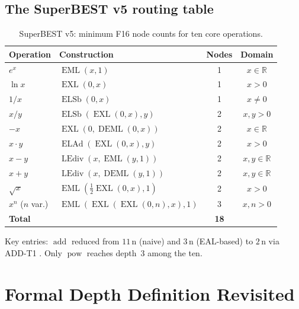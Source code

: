 \documentclass[12pt,a4paper]{article}
\theoremstyle{definition}
\theoremstyle{remark}
\newcommand{\EML}{\operatorname{EML}}
\newcommand{\EXL}{\operatorname{EXL}}
\newcommand{\DEML}{\operatorname{DEML}}
\newcommand{\ELAd}{\operatorname{ELAd}}
\newcommand{\ELSb}{\operatorname{ELSb}}
\newcommand{\LEdiv}{\operatorname{LEdiv}}
\newcommand{\addop}{\operatorname{add}}
\newcommand{\powop}{\operatorname{pow}}
\newcommand{\R}{\mathbb{R}}
\begin{document}
\subsection{The SuperBEST v5 routing table}

\begin{table}[h]
\centering
\caption{SuperBEST v5: minimum F16 node counts for ten core operations.}
\label{tab:v5}
\smallskip
\begin{tabular}{@{}llcc@{}}
\toprule
\textbf{Operation} & \textbf{Construction} & \textbf{Nodes} & \textbf{Domain} \\
\midrule
$e^x$             & $\EML(x,1)$                           & 1  & $x\in\R$ \\
$\ln x$           & $\EXL(0,x)$                           & 1  & $x>0$ \\
$1/x$             & $\ELSb(0,x)$                          & 1  & $x\neq 0$ \\
$x/y$             & $\ELSb(\EXL(0,x),y)$                  & 2  & $x,y>0$ \\
$-x$              & $\EXL(0,\DEML(0,x))$                  & 2  & $x\in\R$ \\
$x\cdot y$        & $\ELAd(\EXL(0,x),y)$                  & 2  & $x>0$ \\
$x-y$             & $\LEdiv(x,\EML(y,1))$                 & 2  & $x,y\in\R$ \\
$x+y$             & $\LEdiv(x,\DEML(y,1))$                & 2  & $x,y\in\R$ \\
$\sqrt{x}$        & $\EML(\tfrac{1}{2}\EXL(0,x),1)$      & 2  & $x>0$ \\
$x^n$ ($n$ var.)  & $\EML(\EXL(\EXL(0,n),x),1)$          & 3  & $x,n>0$ \\
\midrule
\textbf{Total}    &                                        & \textbf{18} & \\
\bottomrule
\end{tabular}

\smallskip\noindent
{\small Key entries: $\addop$ reduced from $11\,\mathrm{n}$ (naive) and $3\,\mathrm{n}$
(EAL-based) to $2\,\mathrm{n}$ via ADD-T1 \cite{ADDT1}.
Only $\powop$ reaches depth~$3$ among the ten.}
\end{table}

\section{Formal Depth Definition Revisited}
\label{sec:formaldef}
\end{document}

